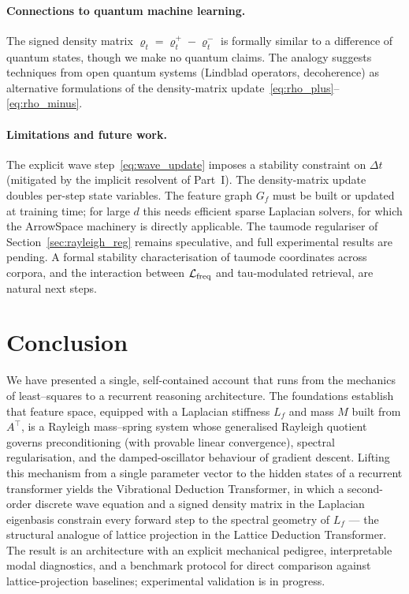 \documentclass[12pt,a4paper]{article}
\theoremstyle{plain}
\theoremstyle{definition}
\theoremstyle{remark}
\newcommand{\1}{\mathbf{1}}
\begin{document}
\paragraph{Connections to quantum machine learning.}
The signed density matrix $\varrho_t = \varrho_t^+ - \varrho_t^-$ is
formally similar to a difference of quantum states, though we make no
quantum claims. The analogy suggests techniques from open quantum systems
(Lindblad operators, decoherence) as alternative formulations of the
density-matrix update~\eqref{eq:rho_plus}--\eqref{eq:rho_minus}.

\paragraph{Limitations and future work.}
The explicit wave step~\eqref{eq:wave_update} imposes a stability
constraint on $\Delta t$ (mitigated by the implicit resolvent of
Part~I). The density-matrix update doubles per-step state variables. The
feature graph $G_f$ must be built or updated at training time; for large
$d$ this needs efficient sparse Laplacian solvers, for which the
ArrowSpace machinery is directly applicable. The taumode regulariser of
Section~\ref{sec:rayleigh_reg} remains speculative, and full
experimental results are pending. A formal stability characterisation of
taumode coordinates across corpora, and the interaction between
$\mathcal{L}_{\rm freq}$ and tau-modulated retrieval, are natural next
steps.

\section{Conclusion}
\label{sec:conclusion}

We have presented a single, self-contained account that runs from the
mechanics of least--squares to a recurrent reasoning architecture. The
foundations establish that feature space, equipped with a Laplacian
stiffness $L_f$ and mass $M$ built from $A^\top$, is a Rayleigh
mass--spring system whose generalised Rayleigh quotient governs
preconditioning (with provable linear convergence), spectral
regularisation, and the damped-oscillator behaviour of gradient descent.
Lifting this mechanism from a single parameter vector to the hidden
states of a recurrent transformer yields the Vibrational Deduction
Transformer, in which a second-order discrete wave equation and a signed
density matrix in the Laplacian eigenbasis constrain every forward step
to the spectral geometry of $L_f$ --- the structural analogue of lattice
projection in the Lattice Deduction Transformer. The result is an
architecture with an explicit mechanical pedigree, interpretable modal
diagnostics, and a benchmark protocol for direct comparison against
lattice-projection baselines; experimental validation is in progress.
\end{document}
